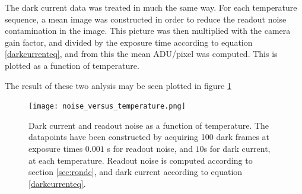 \documentclass[../main.tex]{subfiles}
\begin{document}
		The dark current data was treated in much the same way. For each temperature sequence, a mean image was constructed in order to reduce the readout noise contamination in the image. This picture was then multiplied with the camera gain factor, and divided by the exposure time according to equation \ref{darkcurrenteq}, and from this the mean ADU/pixel was computed. This is plotted as a function of temperature. 
		
		The result of these two anlysis may be seen plotted in figure \ref{fig:noise}	
		
		\begin{figure}
			\centering			\texttt{[image: noise\_versus\_temperature.png]}
			\caption{Dark current and readout noise as a function of temperature. The datapoints have been constructed by acquiring 100 dark frames at exposure times $0.001$ s for readout noise, and $10$s for dark current, at each temperature. Readout noise is computed according to section \ref{sec:rondc}, and dark current according to equation \ref{darkcurrenteq}. }
			\label{fig:noise}
		\end{figure}
	
\end{document}
